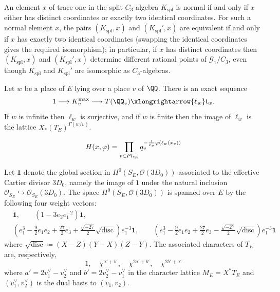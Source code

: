 \begin{example}\label{example:splitAlgebraNormalElement} An element $x$ of trace one in the split $C_3$-algebra $K_{\text{spl}}$ is normal if and only if $x$ either has distinct coordinates or exactly two identical coordinates. For such a normal element $x$, the pairs $(K_{\text{spl}},x)$ and $(K_{\text{spl}}',x)$ are equivalent if and only if $x$ has exactly two identical coordinates (swapping the identical coordinates gives the required isomorphism); in particular, if $x$ has distinct coordinates then $(K_{\text{spl}},x)$ and $(K_{\text{spl}}',x)$ determine different rational points of $\mathcal G_1/C_3$, even though $K_{\text{spl}}$ and $K_{\text{spl}}'$ are isomorphic as $C_3$-algebras. \end{example}

\begin{proposition}\label{prop:basicfacts} Let $w$ be a place of $E$ lying over a place $v$ of $\QQ$. There is an exact sequence \begin{equation} 1 \longrightarrow K_v^{\mathrm{max}} \longrightarrow T(\QQ_v) \xlongrightarrow{\ell_w} \mathfrak t_w. \end{equation} If $w$ is infinite then $\ell_w$ is surjective, and if $w$ is finite then the image of $\ell_w$ is the lattice $X_\ast(T_{E})^{\Gamma(w/v)}$. \end{proposition}

\begin{equation}\label{eqn:heightforrationaladeles} H(x,\varphi) = \prod_{v \in Pl_\QQ} q_v^{-\frac{1}{e_v}\varphi(\ell_w(x_v)) } \end{equation}

\begin{lemma}\label{lemma:heightformula} Let $\mathbf 1$ denote the global section in $H^0(S_E,\mathcal O(3D_0))$ associated to the effective Cartier divisor $3D_0$, namely the image of $1$ under the natural inclusion $\mathcal O_{S_E}\hookrightarrow\mathcal O_{S_E}(3D_0)$. The space $H^0(S_E,\mathcal O(3D_0))$ is spanned over $E$ by the following four weight vectors: \begin{align}\label{eqn:weightVectors} &\mathbf 1,\qquad (1-3e_2e_1^{-2})\mathbf 1, \\ &(e_1^3-\tfrac 92 e_1 e_2+ \tfrac{27}{2} e_3 + \tfrac{\sqrt{-27}}{2} \sqrt{\mathrm{disc}}) e_1^{-3}\mathbf 1,\qquad (e_1^3-\tfrac 92 e_1 e_2+ \tfrac{27}{2} e_3 - \tfrac{\sqrt{-27}}{2} \sqrt{\mathrm{disc}}) e_1^{-3}\mathbf 1 \end{align} where $\sqrt{\mathrm{disc}} \coloneq (X-Z)(Y-X)(Z-Y)$. The associated characters of $T_E$ are, respectively, \begin{equation} 1,\quad \chi^{a'+b'},\quad \chi^{2a'+b'},\quad\chi^{2b'+a'} \end{equation} where $a' = 2v_1^\vee - v_2^\vee$ and $b' = 2v_2^\vee - v_1^\vee$ in the character lattice $M_E = X^\ast T_E$ and $(v_1^\vee,v_2^\vee)$ is the dual basis to $(v_1,v_2)$. \end{lemma}

